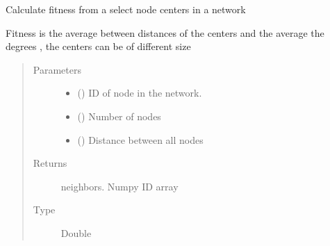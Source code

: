 \documentclass[letterpaper,10pt,english]{sphinxmanual}
\begin{document}

\begin{fulllineitems}
\label{\detokenize{SimulatedAnnealing:SimulatedAnnealing.SimulatedAnnealing.createNeighbors}}
Calculate fitness from a select node centers in a network

Fitness is the average between distances of the centers and the average the degrees , the centers can be of different size
\begin{quote}\begin{description}
\item[{Parameters}] \leavevmode\begin{itemize}
\item {} 
 () \textendash{} ID of node in the network.

\item {} 
 () \textendash{} Number of nodes

\item {} 
 () \textendash{} Distance between all nodes

\end{itemize}

\item[{Returns}] \leavevmode
neighbors. Numpy ID array

\item[{Type}] \leavevmode
Double

\end{description}\end{quote}

\end{fulllineitems}
\end{document}
